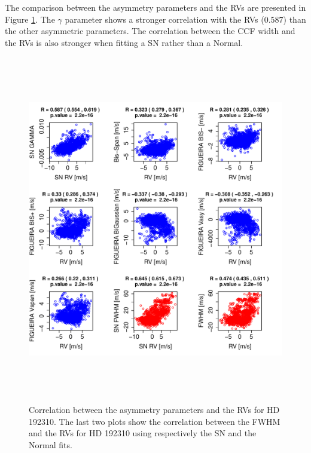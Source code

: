 \documentclass[11pt, oneside]{article}
\begin{document}
The comparison between the asymmetry parameters and the RVs are presented in Figure \ref{fig:Gliese785:corrPlot}. The $\gamma$ parameter shows a stronger correlation with the RVs ($0.587$) than the other asymmetric parameters. The correlation between the CCF width and the RVs is also stronger when fitting a SN rather than a Normal.
%
\begin{figure}[htbp]
   \centering
\includegraphics[height = 6in]{HD19231_[4]Comparison_para.pdf} 
   \caption{Correlation between the asymmetry parameters and the RVs for HD 192310. The last two plots show the correlation between the FWHM and the RVs for HD 192310 using respectively the SN and the Normal fits.}
   \label{fig:Gliese785:corrPlot}
\end{figure}
\end{document}
